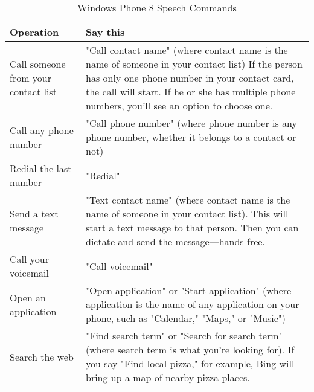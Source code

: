 \begin{table}[htbp]
  \centering
  \caption{Windows Phone 8 Speech Commands}\label{tab:w8sc}
  \renewcommand{\arraystretch}{1.2}
    \begin{tabularx}{\textwidth}{XX}
    \toprule
    Operation  & Say this \\
    \midrule
    Call someone from your contact list & "Call contact name" 
           (where contact name is the name of someone in your contact list) 
           If the person has only one phone number in your contact card, the call will start. If he or she has multiple phone numbers, you'll see an option to choose one. \\ \hline
    Call any phone number & "Call phone number" (where phone number is any phone number, whether it belongs to a contact or not)\\ \hline
     Redial the last number & "Redial" \\ \hline
    Send a text message & "Text contact name" (where contact name is the name of someone in your contact list). This will start a text message to that person. Then you can dictate and send the message—hands-free. \\ \hline
    Call your voicemail & "Call voicemail" \\ \hline
    Open an application & "Open application" or "Start application" (where application is the name of any application on your phone, such as "Calendar," "Maps," or "Music") \\ \hline
    Search the web & "Find search term" or "Search for search term" (where search term is what you're looking for). If you say "Find local pizza," for example, Bing will bring up a map of nearby pizza places. \\
    \bottomrule
    \end{tabularx}
  \label{tab:addlabel}%
\end{table}%
